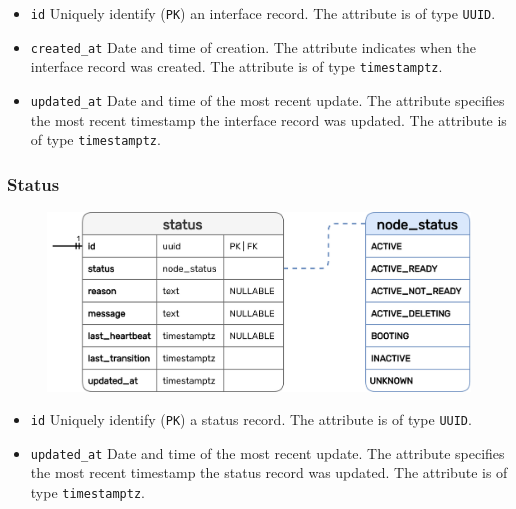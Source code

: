 \begin{itemize}
  \item \texttt{id}
    \newline
    Uniquely identify (\texttt{PK}) an interface record.
    \newline
    The attribute is of type \texttt{UUID}.

  \item \texttt{created\_at}
    \newline
    Date and time of creation.
    \newline
    The attribute indicates when the interface record was created.
    \newline
    The attribute is of type \texttt{timestamptz}.

  \item \texttt{updated\_at}
    \newline
    Date and time of the most recent update.
    \newline
    The attribute specifies the most recent timestamp the interface record was updated.
    \newline
    The attribute is of type \texttt{timestamptz}.
\end{itemize}

\subsubsection{Status}
\label{subsubsec:implementation_server_database_status}

\begin{figure}
  \centering
  \includegraphics[width=\linewidth]{images/implementation/erm_status.png}
\end{figure}

\begin{itemize}
  \item \texttt{id}
    \newline
    Uniquely identify (\texttt{PK}) a status record.
    \newline
    The attribute is of type \texttt{UUID}.

  \item \texttt{updated\_at}
    \newline
    Date and time of the most recent update.
    \newline
    The attribute specifies the most recent timestamp the status record was updated.
    \newline
    The attribute is of type \texttt{timestamptz}.
\end{itemize}

